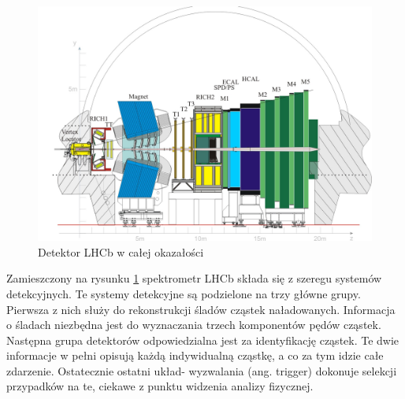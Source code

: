 \begin{figure}  \centering
  \includegraphics[scale=0.7]{rozdzial2/Lhcbview.jpg}
  \caption{Detektor LHCb w całej okazałości \cite{public}}
  \label{fig:Layout}
\end{figure}
Zamieszczony na rysunku \ref{fig:Layout} spektrometr LHCb składa się z szeregu systemów detekcyjnych. Te systemy detekcyjne są podzielone na trzy główne grupy. Pierwsza z nich służy do  rekonstrukcji śladów cząstek naładowanych. Informacja o śladach niezbędna jest do wyznaczania trzech komponentów pędów cząstek. Następna grupa detektorów odpowiedzialna jest za identyfikację cząstek. Te dwie informacje w pełni opisują każdą indywidualną cząstkę, a co za tym idzie całe zdarzenie. Ostatecznie ostatni układ- wyzwalania (ang. trigger) dokonuje selekcji przypadków na te, ciekawe z punktu widzenia analizy fizycznej. 
